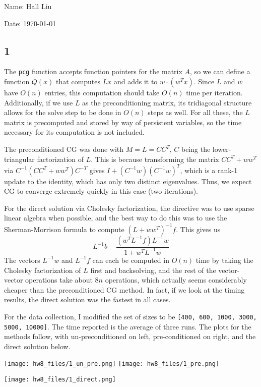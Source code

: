 \documentclass{article}
\begin{document}
Name: Hall Liu

Date: \today 
\vspace{1.5cm}
\subsection*{1}
The \verb|pcg| function accepts function pointers for the matrix $A$, so we can define a function $Q(x)$ that computes $Lx$ and adds it to $w\cdot(w^Tx)$. Since $L$ and $w$ have $O(n)$ entries, this computation should take $O(n)$ time per iteration. Additionally, if we use $L$ as the preconditioning matrix, its tridiagonal structure allows for the solve step to be done in $O(n)$ steps as well.
For all these, the $L$ matrix is precomputed and stored by way of persistent variables, so the time necessary for its computation is not included. 

The preconditioned CG was done with $M=L=CC^T$, $C$ being the lower-triangular factorization of $L$. This is because transforming the matrix $CC^T+ww^T$ via $C^{-1}(CC^T+ww^T)C^{-T}$ gives $I+(C^{-1}w)(C^{-1}w)^T$, which is a rank-1 update to the identity, which has only two distinct eigenvalues. Thus, we expect CG to converge extremely quickly in this case (two iterations). 

For the direct solution via Cholesky factorization, the directive was to use sparse linear algebra when possible, and the best way to do this was to use the Sherman-Morrison formula to compute $(L+ww^T)^{-1}f$. This gives us
\[L^{-1}b-\frac{(w^TL^{-1}f)L^{-1}w}{1+w^TL^{-1}w}\]
The vectors $L^{-1}w$ and $L^{-1}f$ can each be computed in $O(n)$ time by taking the Cholesky factorization of $L$ first and backsolving, and the rest of the vector-vector operations take about $8n$ operations, which actually seems considerably cheaper than the preconditioned CG method. In fact, if we look at the timing results, the direct solution was the fastest in all cases.

For the data collection, I modified the set of sizes to be \verb|[400, 600, 1000, 3000, 5000, 10000]|. The time reported is the average of three runs. The plots for the methods follow, with un-preconditioned on left, pre-conditioned on right, and the direct solution below.

\texttt{[image: hw8\_files/1\_un\_pre.png]}
\texttt{[image: hw8\_files/1\_pre.png]}

\texttt{[image: hw8\_files/1\_direct.png]}
\end{document}
